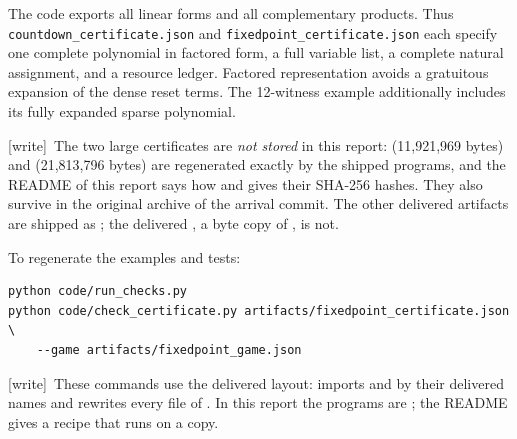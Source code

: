 \documentclass[11pt,letterpaper]{article}
\theoremstyle{definition}
\theoremstyle{remark}
\newcommand{\wtag}{\textup{[write]}}
\begin{document}
The code exports all linear forms and all complementary products. Thus
\nolinkurl{countdown_certificate.json} and
\nolinkurl{fixedpoint_certificate.json} each specify one complete polynomial
in factored form, a full variable list, a complete natural assignment,
and a resource ledger. Factored representation avoids a gratuitous
expansion of the dense reset terms. The 12-witness example additionally
includes its fully expanded sparse polynomial.

\wtag\ The two large certificates are \emph{not stored} in this report:  (11,921,969 bytes) and  (21,813,796 bytes) are regenerated exactly by the shipped programs, and the README of this report says how and gives their SHA-256 hashes. They also survive in the original archive of the arrival commit. The other delivered artifacts are shipped as ; the delivered , a byte copy of , is not.

To regenerate the examples and tests:
\begin{lstlisting}
python code/run_checks.py
python code/check_certificate.py artifacts/fixedpoint_certificate.json \
    --game artifacts/fixedpoint_game.json
\end{lstlisting}
\wtag\ These commands use the delivered layout:  imports  and  by their delivered names and rewrites every file of . In this report the programs are ; the README gives a recipe that runs on a copy.
\end{document}
